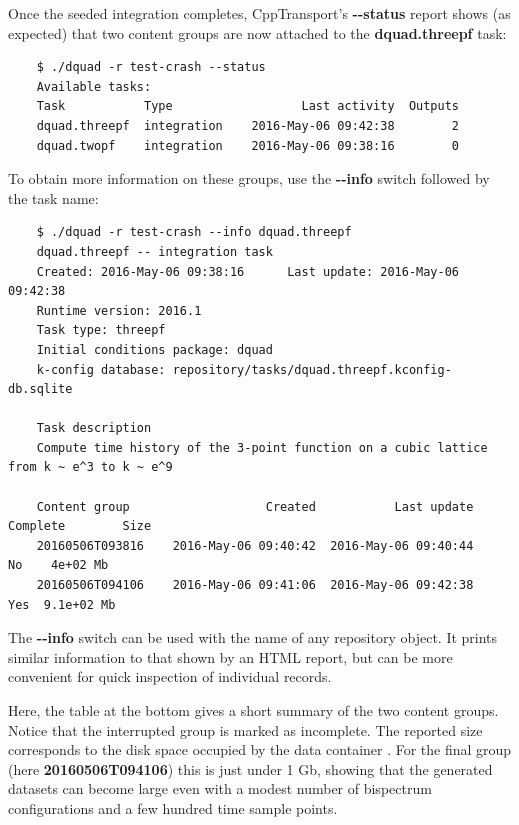 \documentclass[11pt,a4paper]{article}
\renewcommand{\texttt}[1]{{\ttfamily\fontseries{l}\selectfont{#1}}}
\newcommand{\repoobject}[1]{{\ttfamily\bfseries\small #1}}
\newcommand{\packagefont}{\sffamily}
\newcommand{\CppTransport}{{\packagefont CppTransport}}
\newcommand{\file}[1]{\texttt{{#1}}}
\newcommand{\option}[1]{{\ttfamily\bfseries\small #1}}
\begin{document}
Once the seeded integration completes,
{\CppTransport}'s \option{{-}{-}status} report shows (as expected)
that two content groups are now attached to the
\repoobject{dquad.threepf} task:
\begin{verbatim}
    $ ./dquad -r test-crash --status
    Available tasks:
    Task           Type                  Last activity  Outputs
    dquad.threepf  integration    2016-May-06 09:42:38        2
    dquad.twopf    integration    2016-May-06 09:38:16        0    
\end{verbatim}
To obtain more information on these groups, use
the \option{{-}{-}info} switch followed by the task name:
\begin{verbatim}
    $ ./dquad -r test-crash --info dquad.threepf
    dquad.threepf -- integration task
    Created: 2016-May-06 09:38:16      Last update: 2016-May-06 09:42:38  
    Runtime version: 2016.1            
    Task type: threepf  
    Initial conditions package: dquad  
    k-config database: repository/tasks/dquad.threepf.kconfig-db.sqlite  
    
    Task description
    Compute time history of the 3-point function on a cubic lattice from k ~ e^3 to k ~ e^9
    
    Content group                   Created           Last update  Complete        Size
    20160506T093816    2016-May-06 09:40:42  2016-May-06 09:40:44        No    4e+02 Mb
    20160506T094106    2016-May-06 09:41:06  2016-May-06 09:42:38       Yes  9.1e+02 Mb    
\end{verbatim}
The \option{{-}{-}info} switch can be used with the name of any repository object.
It prints similar information to
that shown by an HTML report, but can be more convenient for
quick inspection of individual records.

Here, the table at the bottom gives a short summary of the two
content groups. Notice that the interrupted group is marked as incomplete.
The reported size corresponds to the disk space occupied by the
data container \file{data.sqlite}.
For the final group (here \repoobject{20160506T094106}) this is just under
1 Gb, showing that the generated datasets can become large
even with a modest number of bispectrum configurations
and a few hundred time sample points.
\end{document}

